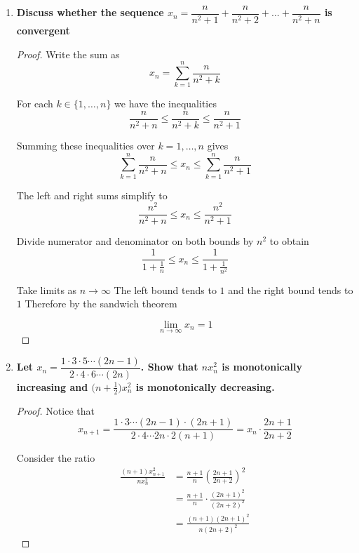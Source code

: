 \documentclass[14pt]{extarticle}
\begin{document}
\begin{enumerate}
\begin{proof}
Now
\[
(n+1)(y_{n+1}-y_n)=x_{n+1}-y_n
\]

But since $x_{n+1}\ge x_k$ for each $k\le n$, the average $y_n$ cannot exceed $x_{n+1}$. Thus $x_{n+1}\ge y_n$ and hence $y_{n+1}\ge y_n$. Therefore $(y_n)$ is monotonically increasing.
\end{proof}

\newpage
\item \textbf{Discuss whether the sequence $x_n=\dfrac{n}{n^2+1}+\dfrac{n}{n^2+2}+\dots+\dfrac{n}{n^2+n}$ is convergent}

\begin{proof}
Write the sum as
\[
x_n=\sum_{k=1}^n \frac{n}{n^2+k}
\]

For each $k\in\{1,\dots,n\}$ we have the inequalities
\[
\frac{n}{n^2+n}\le \frac{n}{n^2+k}\le \frac{n}{n^2+1}
\]

Summing these inequalities over $k=1,\dots,n$ gives
\[
\sum_{k=1}^n \frac{n}{n^2+n} \le x_n \le \sum_{k=1}^n \frac{n}{n^2+1}
\]

The left and right sums simplify to
\[
\frac{n^2}{n^2+n} \le x_n \le \frac{n^2}{n^2+1}
\]

Divide numerator and denominator on both bounds by $n^2$ to obtain
\[
\frac{1}{1+\tfrac{1}{n}} \le x_n \le \frac{1}{1+\tfrac{1}{n^2}}
\]

Take limits as $n\to\infty$ The left bound tends to $1$ and the right bound tends to $1$ Therefore by the sandwich theorem

\[
\boxed{\lim_{n\to\infty} x_n = 1}
\]
\end{proof}


\newpage
\item \textbf{Let $x_n=\dfrac{1\cdot 3\cdot 5\cdots (2n-1)}{2\cdot 4\cdot 6\cdots (2n)}$. Show that $nx_n^2$ is monotonically increasing and $\bigl(n+\tfrac12\bigr)x_n^2$ is monotonically decreasing.}

\begin{proof}

Notice that
\[
x_{n+1} = \frac{1\cdot 3\cdots (2n-1)\cdot (2n+1)}{2\cdot 4\cdots 2n \cdot 2(n+1)}
= x_n \cdot \frac{2n+1}{2n+2}
\]

\medskip

Consider the ratio
\begin{align*}
\frac{(n+1)x_{n+1}^2}{n x_n^2} &= \frac{n+1}{n} \left(\frac{2n+1}{2n+2}\right)^2 \\
&= \frac{n+1}{n} \cdot \frac{(2n+1)^2}{(2n+2)^2} \\
&= \frac{(n+1)(2n+1)^2}{n(2n+2)^2}
\end{align*}


\end{proof}
\end{enumerate}
\end{document}
